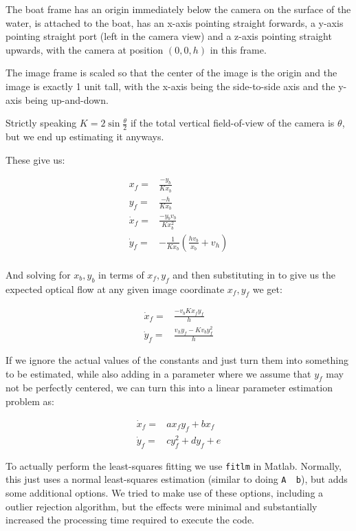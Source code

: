 \documentclass{article}
\begin{document}
The boat frame has an origin immediately below the camera on the surface of
the water, is attached to the boat, has an x-axis pointing straight forwards,
a y-axis pointing straight port (left in the camera view) and a z-axis pointing
straight upwards, with the camera at position $(0, 0, h)$ in this frame.

The image frame is scaled so that the center of the image is the origin and
the image is exactly 1 unit tall, with the x-axis being the side-to-side axis
and the y-axis being up-and-down.

Strictly speaking $K = 2\sin\frac\theta2$ if the total vertical field-of-view
of the camera is $\theta$, but we end up estimating it anyways.

These give us:

\begin{align*}
x_f =& \frac{-y_b}{Kx_b} \\
y_f =& \frac{-h}{Kx_b} \\
\dot{x}_f =& \frac{-y_bv_b}{Kx^2_b} \\
\dot{y}_f =& -\frac{1}{Kx_b}(\frac{hv_b}{x_b} + v_h) \\
\end{align*}

And solving for $x_b, y_b$ in terms of $x_f, y_f$ and then substituting in to
give us the expected optical flow at any given image coordinate $x_f, y_f$ we
get:

\begin{align}
\dot{x}_f =& \frac{-v_bKx_fy_f}{h} \\
\dot{y}_f =& \frac{v_hy_f - Kv_by_f^2}{h}
\end{align}

If we ignore the actual values of the constants and just turn them into
something to be estimated, while also adding in a parameter where we
assume that $y_f$ may not be perfectly centered, we can turn this into a
linear parameter estimation problem as:

\begin{align}
\dot{x}_f =& ax_fy_f + bx_f \\
\dot{y}_f =& cy_f^2 + dy_f + e
\end{align}

To actually perform the least-squares fitting we use \texttt{fitlm} in
Matlab. Normally, this just uses a normal least-squares estimation
(similar to doing \texttt{A \ b}), but adds some additional
options. We tried to make use of these options, including a outlier
rejection algorithm, but the effects were minimal and substantially
increased the processing time required to execute the code.
\end{document}
